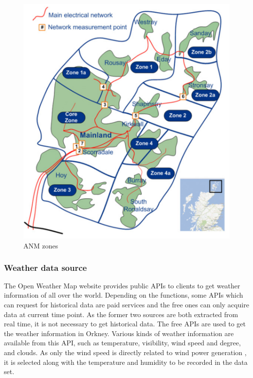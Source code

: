 \documentclass[12pt,a4paper]{report}
\begin{document}
                \begin{figure}[ht]
                    \centerline{\includegraphics[scale=1]{map}}
                    \caption{ANM zones}
                    \label{fig_map}
                \end{figure}
            
            \subsubsection{Weather data source}
            \label{text_weather_data_source}
                The Open Weather Map website \cite{website:OpenWeatherMap} provides public APIs to clients to get weather information of all over the world.
                Depending on the functions, some APIs which can request for historical data are paid services and the free ones can only acquire data at current time point.
                As the former two sources are both extracted from real time, it is not necessary to get historical data. The free APIs are used to get the weather
                information in Orkney. Various kinds of weather information are available from this API, such as temperature, visibility, wind speed and degree, and clouds.
                As only the wind speed is directly related to wind power generation \cite{paper:Shao2010}, it is selected along with the temperature and humidity to be recorded in the data set.
            
\end{document}
